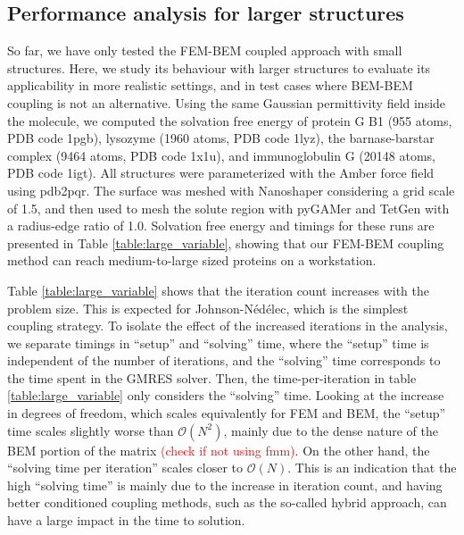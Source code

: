 \subsection*{\sffamily \large Performance analysis for larger structures}

So far, we have only tested the FEM-BEM coupled approach with small structures. Here, we study its behaviour with larger structures to evaluate its applicability in more realistic settings, and  in test cases where BEM-BEM coupling is not an alternative. Using the same Gaussian permittivity field inside the molecule, we computed the solvation free energy of protein G B1 (955 atoms, PDB code 1pgb), lysozyme (1960 atoms, PDB code 1lyz), the barnase-barstar complex (9464 atoms, PDB code 1x1u), and immunoglobulin G (20148 atoms, PDB code 1igt). All structures were parameterized with the Amber\cite{Swanson05} force field using pdb2pqr.\cite{Dolinsky04} The surface was meshed with Nanoshaper\cite{decherchi2013general} considering a grid scale of 1.5, and then used to mesh the solute region with pyGAMer\cite{lee2020open} and TetGen\cite{hang2015tetgen} with a radius-edge ratio of 1.0. Solvation free energy and timings for these runs are presented in Table \ref{table:large_variable}, showing that our FEM-BEM coupling method can reach medium-to-large sized proteins on a workstation. 

Table \ref{table:large_variable} shows that the iteration count increases with the problem size. This is expected for Johnson-N\'ed\'elec, which is the simplest coupling strategy. To isolate the effect of the increased iterations in the analysis, we separate timings in ``setup'' and ``solving'' time, where the ``setup'' time is independent of the number of iterations, and the ``solving'' time corresponds to the time spent in the GMRES solver. Then, the time-per-iteration in table \ref{table:large_variable} only considers the ``solving'' time. Looking at the increase in degrees of freedom, which scales equivalently for FEM and BEM, the ``setup'' time scales slightly worse than $\mathcal{O}(N^2)$, mainly due to the dense nature of the BEM portion of the matrix \textcolor{red}{(check if not using fmm)}. On the other hand, the ``solving time per iteration'' scales closer to $\mathcal{O}(N)$. This is an indication that the high ``solving time'' is mainly due to the increase in iteration count, and having better conditioned coupling methods, such as the so-called hybrid approach,\cite{betcke2022hybrid} can have a large impact in the time to solution.

